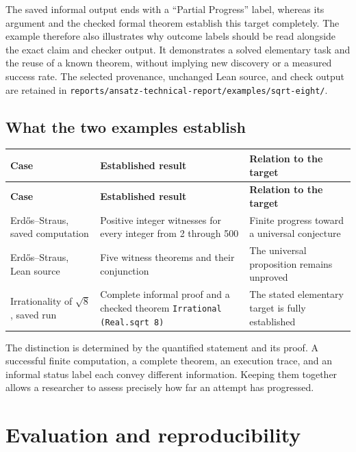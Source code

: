 \documentclass[10pt,letterpaper]{article}
\begin{document}
The saved informal output ends with a ``Partial Progress'' label, whereas its argument and the checked formal theorem establish this target completely. The example therefore also illustrates why outcome labels should be read alongside the exact claim and checker output. It demonstrates a solved elementary task and the reuse of a known theorem, without implying new discovery or a measured success rate. The selected provenance, unchanged Lean source, and check output are retained in \nolinkurl{reports/ansatz-technical-report/examples/sqrt-eight/}.

\subsection{What the two examples establish}

\begingroup\small
\setlength{\tabcolsep}{4pt}
\begin{longtable}{>{\raggedright\arraybackslash}p{0.23\dimexpr\linewidth-6\tabcolsep\relax}>{\raggedright\arraybackslash}p{0.38\dimexpr\linewidth-6\tabcolsep\relax}>{\raggedright\arraybackslash}p{0.39\dimexpr\linewidth-6\tabcolsep\relax}}
\toprule
\textbf{Case} & \textbf{Established result} & \textbf{Relation to the target} \\
\midrule\endfirsthead
\toprule
\textbf{Case} & \textbf{Established result} & \textbf{Relation to the target} \\
\midrule\endhead
\bottomrule\endfoot
Erd\H{o}s--Straus, saved computation & Positive integer witnesses for every integer from 2 through 500 & Finite progress toward a universal conjecture \\
Erd\H{o}s--Straus, Lean source & Five witness theorems and their conjunction & The universal proposition remains unproved \\
Irrationality of $\sqrt{8}$, saved run & Complete informal proof and a checked theorem \texttt{Irrational (Real.sqrt 8)} & The stated elementary target is fully established \\
\end{longtable}
\endgroup

The distinction is determined by the quantified statement and its proof. A successful finite computation, a complete theorem, an execution trace, and an informal status label each convey different information. Keeping them together allows a researcher to assess precisely how far an attempt has progressed.

\section{Evaluation and reproducibility}
\end{document}
